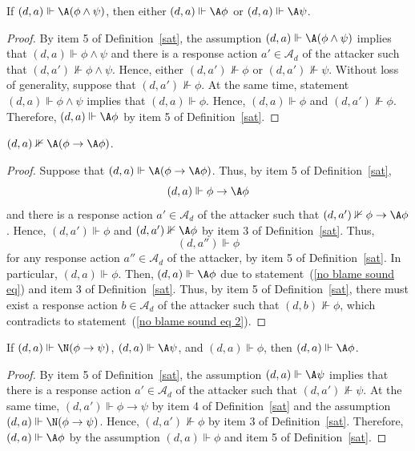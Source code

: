 \documentclass[letterpaper]{article}
\begin{document}
\begin{lemma}\label{conjunction sound}
If $(d,a)\Vdash \A(\phi\wedge\psi)$, then either $(d,a)\Vdash \A\phi$ or $(d,a)\Vdash \A\psi$.
\end{lemma}
\begin{proof}
By item 5 of Definition~\ref{sat}, the assumption $(d,a)\Vdash \A(\phi\wedge\psi)$ implies that $(d,a)\Vdash \phi\wedge\psi$ and there is a response action $a'\in\mathcal{A}_d$ of the attacker such that $(d,a')\nVdash \phi\wedge\psi$. Hence, either $(d,a')\nVdash \phi$ or $(d,a')\nVdash \psi$. Without loss of generality, suppose that $(d,a')\nVdash \phi$. At the same time, statement $(d,a)\Vdash \phi\wedge\psi$ implies that $(d,a)\Vdash \phi$. Hence, $(d,a)\Vdash \phi$ and $(d,a')\nVdash \phi$. Therefore, $(d,a)\Vdash \A\phi$ by item 5 of Definition~\ref{sat}.
\end{proof}

\begin{lemma}
$(d,a)\nVdash\A(\phi\to\A\phi)$.
\end{lemma}
\begin{proof}
Suppose that $(d,a)\Vdash\A(\phi\to\A\phi)$. Thus, by item 5 of Definition~\ref{sat},
\begin{equation}\label{no blame sound eq}
    (d,a)\Vdash\phi\to\A\phi
\end{equation}
and there is a response action $a'\in\mathcal{A}_d$ of the attacker such that $(d,a')\nVdash\phi\to\A\phi$. Hence, $(d,a')\Vdash\phi$ and $(d,a')\nVdash\A\phi$ by item 3 of Definition~\ref{sat}. Thus,
\begin{equation}\label{no blame sound eq 2}
    (d,a'')\Vdash\phi
\end{equation}
for any response action $a''\in\mathcal{A}_d$ of the attacker, by item 5 of Definition~\ref{sat}. In particular, $(d,a)\Vdash\phi$. Then, $(d,a)\Vdash\A\phi$ due to statement~(\ref{no blame sound eq}) and item 3 of Definition~\ref{sat}. Thus, by item 5 of Definition~\ref{sat}, there must exist a response action $b\in\mathcal{A}_d$ of the attacker such that $(d,b)\nVdash\phi$, which contradicts to statement~(\ref{no blame sound eq 2}).
\end{proof}

\begin{lemma}\label{strict conditional soundness}
If $(d,a)\Vdash \N(\phi\to\psi)$, $(d,a)\Vdash \A\psi$, and $(d,a)\Vdash \phi$, then $(d,a)\Vdash \A\phi$.
\end{lemma}
\begin{proof}
By item 5 of Definition~\ref{sat}, the assumption $(d,a)\Vdash \A\psi$ implies that there is a response action $a'\in\mathcal{A}_d$ of the attacker such that $(d,a')\nVdash \psi$. At the same time, $(d,a')\Vdash \phi\to\psi$ by item 4 of Definition~\ref{sat} and the assumption $(d,a)\Vdash \N(\phi\to\psi)$. Hence, $(d,a')\nVdash \phi$ by item 3 of Definition~\ref{sat}. Therefore, $(d,a)\Vdash \A\phi$ by the assumption $(d,a)\Vdash \phi$ and item 5 of Definition~\ref{sat}.
\end{proof}
\end{document}

